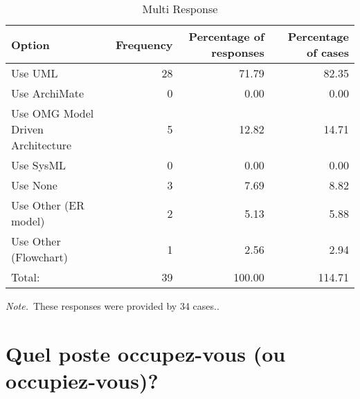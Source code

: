 \documentclass[a4paper,man,hidelinks,floatsintext,x11names]{apa7}
\begin{document}
    
\begin{table}[!htbp]
\caption{Multi Response}
\label{tab:Table_1}
\begin{adjustbox}{max size={\columnwidth}{\textheight}}
\centering
\begin{tabular}{lrrr}
\toprule
Option                            & Frequency & Percentage of responses & Percentage of cases \\
\midrule
Use UML                           &        28 &                   71.79 &               82.35 \\
Use ArchiMate                     &         0 &                    0.00 &                0.00 \\
Use OMG Model Driven Architecture &         5 &                   12.82 &               14.71 \\
Use SysML                         &         0 &                    0.00 &                0.00 \\
Use None                          &         3 &                    7.69 &                8.82 \\
Use Other (ER model)              &         2 &                    5.13 &                5.88 \\
Use Other (Flowchart)             &         1 &                    2.56 &                2.94 \\
Total:                            &        39 &                  100.00 &              114.71 \\
\bottomrule
\end{tabular}
\end{adjustbox}
\begin{tablenotes} {
\small
\textit{Note.}~These responses were provided by 34 cases.. \\
}
\end{tablenotes}
\end{table}


      
        
      
    
      
      
    
      
        
      
    
      
      
    
            
\section{Quel poste occupez-vous (ou occupiez-vous)?}
\end{document}
